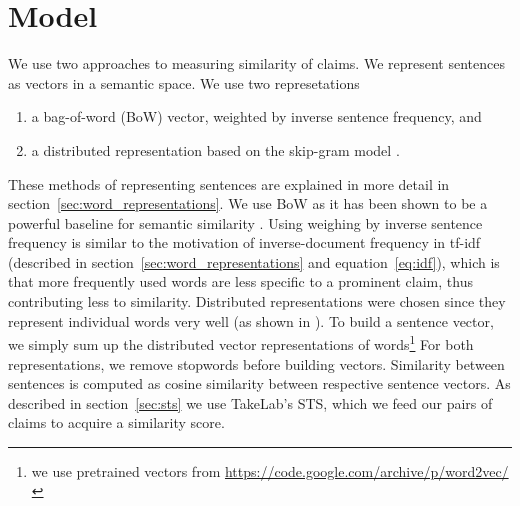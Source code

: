 \section{Model}
\label{sec:argclu_model}

We use two approaches to measuring similarity of claims. 
We represent sentences as vectors in a semantic space. 
We use two represetations 
\begin{enumerate} 
\item a bag-of-word (BoW) vector, weighted
by inverse sentence frequency, and 
\item a distributed representation based on the skip-gram model
	\citep{mikolov2013distributed}. 
\end{enumerate}
These methods of representing sentences are explained in more detail in 
section~\ref{sec:word_representations}. 
We use BoW as it has been shown to be a powerful baseline for semantic similarity 
\citep{ramage2009random}. 
Using weighing by inverse sentence frequency is similar to the motivation 
of inverse-document frequency in tf-idf (described in section~\ref{sec:word_representations} and
equation~\ref{eq:idf}), which is that more frequently used words are less
specific to a prominent claim, thus contributing less to similarity. 
Distributed representations were chosen since they represent individual words 
very well (as shown in \citep{mikolov2013efficient, mikolov2013distributed}).
To build a sentence vector, we simply sum up the distributed vector representations 
of words\footnote{we use pretrained vectors from \url{https://code.google.com/archive/p/word2vec/}}
For both representations, we remove stopwords before building vectors. 
Similarity between sentences is computed as cosine similarity between 
respective sentence vectors. 
As described in section~\ref{sec:sts} we use TakeLab's STS, which we feed our pairs
of claims to acquire a similarity score. 

